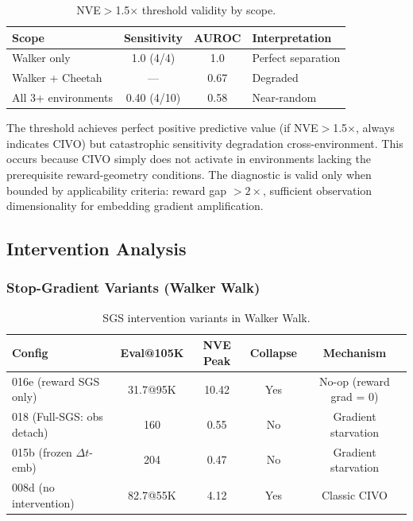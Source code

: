 \documentclass[letterpaper]{article}
\begin{document}
\begin{table}[h]
\centering
\caption{NVE$>$1.5$\times$ threshold validity by scope.}
\label{tab:threshold}
\begin{tabular}{lccl}
\toprule
Scope & Sensitivity & AUROC & Interpretation \\
\midrule
Walker only & 1.0 (4/4) & 1.0 & Perfect separation \\
Walker + Cheetah & --- & 0.67 & Degraded \\
All 3+ environments & 0.40 (4/10) & 0.58 & Near-random \\
\bottomrule
\end{tabular}
\end{table}

The threshold achieves perfect positive predictive value (if NVE$>$1.5$\times$, always indicates CIVO) but catastrophic sensitivity degradation cross-environment. This occurs because CIVO simply does not activate in environments lacking the prerequisite reward-geometry conditions. The diagnostic is valid only when bounded by applicability criteria: reward gap $> 2\times$, sufficient observation dimensionality for embedding gradient amplification.

\subsection{Intervention Analysis}

\subsubsection{Stop-Gradient Variants (Walker Walk)}

\begin{table}[h]
\centering
\caption{SGS intervention variants in Walker Walk.}
\label{tab:sgs}
\begin{tabular}{lcccc}
\toprule
Config & Eval@105K & NVE Peak & Collapse & Mechanism \\
\midrule
016e (reward SGS only) & 31.7@95K & 10.42 & Yes & No-op (reward grad = 0) \\
018 (Full-SGS: obs detach) & 160 & 0.55 & No & Gradient starvation \\
015b (frozen $\Delta t$-emb) & 204 & 0.47 & No & Gradient starvation \\
008d (no intervention) & 82.7@55K & 4.12 & Yes & Classic CIVO \\
\bottomrule
\end{tabular}
\end{table}
\end{document}
